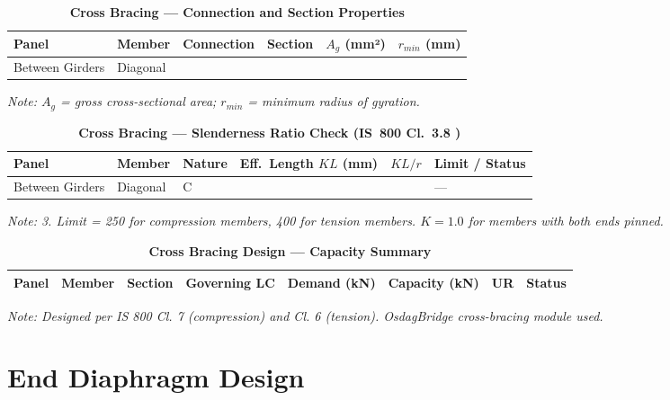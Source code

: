 \documentclass{article}
\begin{document}
\vspace{1em}

\vspace{0.4em}
\noindent
\setlength{\tabcolsep}{4pt}
\setlength\LTleft{0pt}
\setlength\LTright{\fill}

\begin{longtable}{|C{2.0cm}|L{2.0cm}|L{2.2cm}|C{2.5cm}|C{2.0cm}|C{2.0cm}|}
\caption{\textbf{Cross Bracing --- Connection and Section Properties}}
\hline
\textbf{Panel} & \textbf{Member} & \textbf{Connection} & \textbf{Section} & \textbf{$A_g$ (mm²)} & \textbf{$r_{min}$ (mm)} \\[6pt]
\hline
Between Girders & Diagonal &  &  &  &  \\[6pt]
\hline
\end{longtable}
\noindent\textit{Note: $A_g$ = gross cross-sectional area; $r_{min}$ = minimum radius of gyration.}

\vspace{1em}
\begin{longtable}{|C{2.2cm}|L{2.2cm}|L{2.5cm}|C{2.5cm}|C{2.5cm}|>{\centering\arraybackslash}p{3.6cm}|}
\caption{\textbf{Cross Bracing --- Slenderness Ratio Check (IS~800 Cl.~3.8 )}}
\hline
\textbf{Panel} & \textbf{Member} & \textbf{Nature} & \textbf{Eff.\ Length $KL$ (mm)} & \textbf{$KL/r$} & \textbf{Limit / Status} \\[6pt]
\hline
Between Girders & Diagonal & C &  &  &  ---  \\[6pt]
\hline
\end{longtable}
\noindent\textit{Note:  3. Limit = 250 for compression members, 400 for tension members. $K = 1.0$ for members with both ends pinned.}

\vspace{1em}
\begin{longtable}{|C{2.0cm}|L{1.8cm}|C{2.2cm}|C{3.0cm}|C{1.8cm}|C{1.8cm}|C{1.2cm}|C{1.8cm}|}
\caption{\textbf{Cross Bracing Design --- Capacity Summary}}
\hline
\textbf{Panel} & \textbf{Member} & \textbf{Section} & \textbf{Governing LC} & \textbf{Demand (kN)} & \textbf{Capacity (kN)} & \textbf{UR} & \textbf{Status} \\[6pt]
\hline

\end{longtable}
\noindent\textit{Note: Designed per IS 800 Cl. 7 (compression) and Cl. 6 (tension). OsdagBridge cross-bracing module used.}

\section{End Diaphragm Design}
\label{sec:end-diaphragm}
\end{document}
